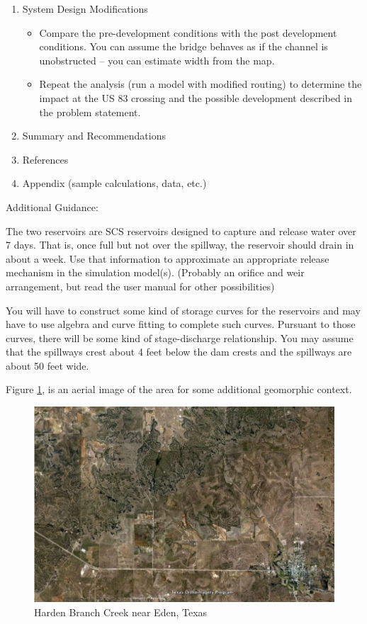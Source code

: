 \documentclass[12pt]{article}
\begin{document}
\begin{enumerate}
\begin{itemize}
\end{itemize}
\item System Design Modifications
\begin{itemize}
    \item Compare the pre-development conditions with the post development conditions. You can assume the bridge behaves as if the channel is unobstructed – you can estimate width from the map.
    \item Repeat the analysis (run a model with modified routing) to determine the impact at the US 83 crossing and the possible development described in the problem statement.
\end{itemize}
\item Summary and Recommendations
\item References
\item Appendix (sample calculations, data, etc.)
\end{enumerate}

Additional Guidance:

The two reservoirs are SCS reservoirs designed to capture and release water over 7 days. That is, once full but not over the spillway, the reservoir should drain in about a week. Use that information to approximate an appropriate release mechanism in the simulation model(s). (Probably an orifice and weir arrangement, but read the user manual for other possibilities)

You will have to construct some kind of storage curves for the reservoirs and may have to use algebra and curve fitting to complete such curves. Pursuant to those curves, there will be some kind of stage-discharge relationship. You may assume that the spillways crest about 4 feet below the dam crests and the spillways are about 50 feet wide.

\clearpage

Figure \ref{fig:aerial}, is an aerial image of the area for some additional geomorphic context.

\begin{figure}[h!] %
   \centering
   \includegraphics[width=6in]{aerial.png} 
   \caption{Harden Branch Creek near Eden, Texas}
   \label{fig:aerial}
\end{figure}
\end{document}
